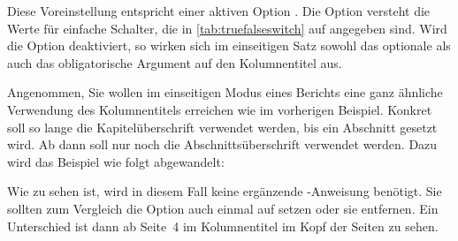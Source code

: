    Diese Voreinstellung entspricht einer aktiven Option
  . Die Option versteht
  die Werte für einfache Schalter, die in \autoref{tab:truefalseswitch} auf
   angegeben sind. Wird die Option
  deaktiviert, so wirken sich im einseitigen Satz sowohl das optionale als
  auch das obligatorische Argument auf den Kolumnentitel aus.%
  \IfThisCommonLabelBase{scrlayer-scrpage}{\iftrue}{\csname
    iffalse\endcsname}%
    \begin{Example}
      Angenommen, Sie wollen im einseitigen Modus eines Berichts eine ganz
      ähnliche Verwendung des Kolumnentitels erreichen wie im vorherigen
      Beispiel. Konkret soll so lange die Kapitelüberschrift verwendet werden,
      bis ein Abschnitt gesetzt wird. Ab dann soll nur noch die
      Abschnittsüberschrift verwendet werden. Dazu wird das Beispiel wie folgt
      abgewandelt:
      Wie zu sehen ist, wird in diesem Fall keine ergänzende
      -Anweisung benötigt. Sie sollten zum
      Vergleich die Option  auch einmal auf 
      setzen oder sie entfernen. Ein Unterschied ist dann ab Seite~4 im
      Kolumnentitel im Kopf der Seiten zu sehen.
    \end{Example}
  \fi

